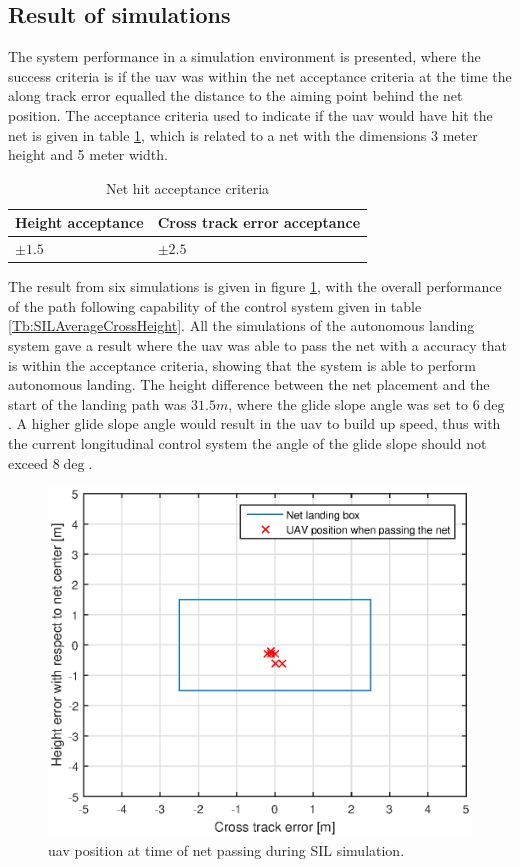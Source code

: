 \subsection{Result of simulations}\label{SIL:Results}
The system performance in a simulation environment is presented, where the success criteria is if the \gls{uav} was within the net acceptance criteria at the time the along track error equalled the distance to the aiming point behind the net position. The acceptance criteria used to indicate if the \gls{uav} would have hit the net is given in table \ref{tb:NetCriteria}, which is related to a net with the dimensions 3 meter height and 5 meter width.
\begin{table}[H]
\centering
\begin{tabular}{| l | l |}
\hline
\textbf{Height acceptance}	& \textbf{Cross track error acceptance}	\\ \hline
$\pm1.5$					& $\pm2.5$								\\ \hline
\end{tabular}
\caption{Net hit acceptance criteria}
\label{tb:NetCriteria}
\end{table}
The result from six simulations is given in figure \ref{Fig:SILNetPasing}, with the overall performance of the path following capability of the control system given in table \ref{Tb:SILAverageCrossHeight}. All the simulations of the autonomous landing system gave a result where the \gls{uav} was able to pass the net with a accuracy that is within the acceptance criteria, showing that the system is able to perform autonomous landing. The height difference between the net placement and the start of the landing path was $31.5 m$, where the glide slope angle was set to $6\deg$. A higher glide slope angle would result in the \gls{uav} to build up speed, thus with the current longitudinal control system the angle of the glide slope should not exceed $8\deg$.
\newpage
\begin{figure}[H]
\centering
\includegraphics[scale=0.7]{figs/SysPlot/SILNetPasing.eps}
\caption{\gls{uav} position at time of net passing during SIL simulation.}
\label{Fig:SILNetPasing}
\end{figure}
